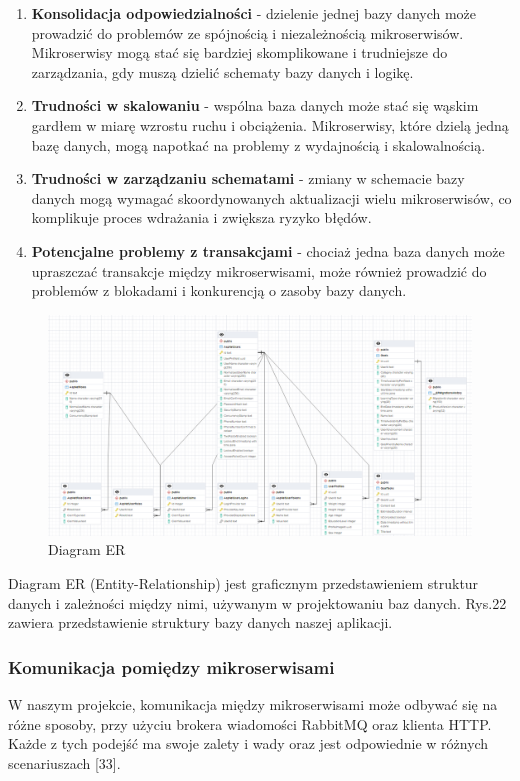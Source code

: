 \begin{enumerate}
\item {\bf Konsolidacja odpowiedzialności} - dzielenie jednej bazy danych może prowadzić do problemów ze spójnością i niezależnością mikroserwisów. Mikroserwisy mogą stać się bardziej skomplikowane i trudniejsze do zarządzania, gdy muszą dzielić schematy bazy danych i logikę.
\item {\bf Trudności w skalowaniu} - wspólna baza danych może stać się wąskim gardłem w miarę wzrostu ruchu i obciążenia. Mikroserwisy, które dzielą jedną bazę danych, mogą napotkać na problemy z wydajnością i skalowalnością.
\item {\bf Trudności w zarządzaniu schematami} - zmiany w schemacie bazy danych mogą wymagać skoordynowanych aktualizacji wielu mikroserwisów, co komplikuje proces wdrażania i zwiększa ryzyko błędów.
\item {\bf Potencjalne problemy z transakcjami} - chociaż jedna baza danych może upraszczać transakcje między mikroserwisami, może również prowadzić do problemów z blokadami i konkurencją o zasoby bazy danych.
\end{enumerate}

\begin{figure}[H]
    \centering
    \includegraphics[width=1\linewidth]{Obrazy/erBazyDanych.png}
    \caption{Diagram ER}
    \label{fig:enter-label}
\end{figure}

Diagram ER (Entity-Relationship) jest graficznym przedstawieniem struktur danych i zależności między nimi, używanym w projektowaniu baz danych. Rys.22 zawiera przedstawienie struktury bazy danych naszej aplikacji.

\subsubsection{Komunikacja pomiędzy mikroserwisami}
W naszym projekcie, komunikacja między mikroserwisami może odbywać się na różne sposoby, przy użyciu brokera wiadomości RabbitMQ oraz klienta HTTP. Każde z tych podejść ma swoje zalety i wady oraz jest odpowiednie w różnych scenariuszach [33].

